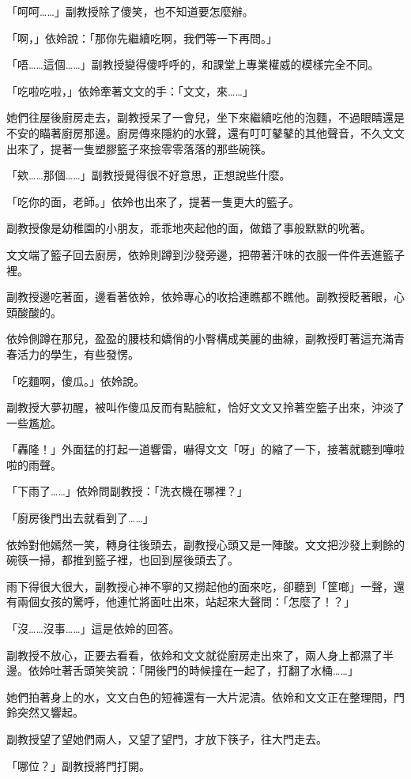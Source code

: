 「呵呵……」副教授除了傻笑，也不知道要怎麼辦。

「啊，」依姈說：「那你先繼續吃啊，我們等一下再問。」

「唔……這個……」副教授變得傻呼呼的，和課堂上專業權威的模樣完全不同。

「吃啦吃啦，」依姈牽著文文的手：「文文，來……」

她們往屋後廚房走去，副教授呆了一會兒，坐下來繼續吃他的泡麵，不過眼睛還是不安的瞄著廚房那邊。廚房傳來隱約的水聲，還有叮叮鼕鼕的其他聲音，不久文文出來了，提著一隻塑膠籃子來撿零零落落的那些碗筷。

「欸……那個……」副教授覺得很不好意思，正想說些什麼。

「吃你的面，老師。」依姈也出來了，提著一隻更大的籃子。

副教授像是幼稚園的小朋友，乖乖地夾起他的面，做錯了事般默默的吮著。

文文端了籃子回去廚房，依姈則蹲到沙發旁邊，把帶著汗味的衣服一件件丟進籃子裡。

副教授邊吃著面，邊看著依姈，依姈專心的收拾連瞧都不瞧他。副教授眨著眼，心頭酸酸的。

依姈側蹲在那兒，盈盈的腰枝和嬌俏的小臀構成美麗的曲線，副教授盯著這充滿青春活力的學生，有些發愣。

「吃麵啊，傻瓜。」依姈說。

副教授大夢初醒，被叫作傻瓜反而有點臉紅，恰好文文又拎著空籃子出來，沖淡了一些尷尬。

「轟隆！」外面猛的打起一道響雷，嚇得文文「呀」的縮了一下，接著就聽到嘩啦啦的雨聲。

「下雨了……」依姈問副教授：「洗衣機在哪裡？」

「廚房後門出去就看到了……」

依姈對他嫣然一笑，轉身往後頭去，副教授心頭又是一陣酸。文文把沙發上剩餘的碗筷一掃，都推到籃子裡，也回到屋後頭去了。

雨下得很大很大，副教授心神不寧的又撈起他的面來吃，卻聽到「筐啷」一聲，還有兩個女孩的驚呼，他連忙將面吐出來，站起來大聲問：「怎麼了！？」

「沒……沒事……」這是依姈的回答。

副教授不放心，正要去看看，依姈和文文就從廚房走出來了，兩人身上都濕了半邊。依姈吐著舌頭笑笑說：「開後門的時候撞在一起了，打翻了水桶……」

她們拍著身上的水，文文白色的短褲還有一大片泥漬。依姈和文文正在整理間，門鈴突然又響起。

副教授望了望她們兩人，又望了望門，才放下筷子，往大門走去。

「哪位？」副教授將門打開。

